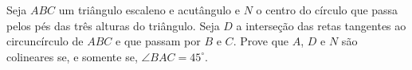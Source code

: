 Seja $ABC$ um triângulo escaleno e acutângulo e $N$ o centro do círculo que passa pelos pés das três alturas do triângulo. Seja $D$ a interseção das retas tangentes ao circuncírculo de $ABC$ e que passam por $B$ e $C$. Prove que $A$, $D$ e $N$ são colineares se, e somente se, $\angle BAC = 45^\circ$.